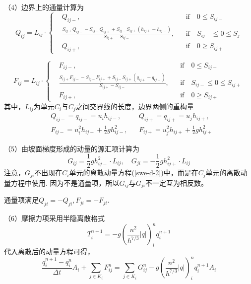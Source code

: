 （4）边界上的通量计算为
\begin{equation}
	Q_{ij} = L_{ij} \cdot \left\{
	\begin{aligned}
		& Q_{ij-}, && \mbox{if} \quad 0\leq S_{ij-} \\
		& \frac{S_{ij+} Q_{ij-} - S_{ij-} Q_{ij+} + S_{ij-} S_{ij+} \left(h_{ij+} - h_{ij-}\right)}{S_{ij+}-S_{ij-}} , && \mbox{if} \quad S_{ij-} \leq 0\leq S_j\\
		& Q_{ij+}, && \mbox{if} \quad 0\geq S_{ij+}
	\end{aligned}\right.
\end{equation}

\begin{equation}
F_{ij} = L_{ij} \cdot \left\{
\begin{aligned}
	& F_{ij-}, && \mbox{if} \quad 0\leq S_{ij-} \\
	& \frac{S_{ij+} F_{ij-} - S_{ij-} F_{ij+} + S_{ij-} S_{ij+} \left(q_{ij+} - q_{ij-}\right)}{S_{ij+}-S_{ij-}} , && \mbox{if} \quad S_{ij-} \leq 0\leq S_{ij+}\\
	& F_{ij+}, && \mbox{if} \quad 0\geq S_{ij+}
\end{aligned}\right.
\end{equation}
其中，$L_{ij}$为单元$C_i$与$C_j$之间交界线的长度，边界两侧的重构量
\begin{align*}
&Q_{ij-} = q_{ij-} = u_i h_{ij-},  && Q_{ij+} = q_{ij+} = u_j h_{ij+}, \\
&F_{ij-} = u_i^2h_{ij-}+\frac{1}{2}gh_{ij-}^2, && F_{ij+} = u_j^2h_{ij+}+\frac{1}{2}gh_{ij+}^2
\end{align*}

（5）由坡面梯度形成的动量的源汇项计算为\citep{audusse2004scientificcomputing}
\begin{equation}
G_{ij} = \frac{1}{2}gh_{ij-}^2 \cdot L_{ij}, \quad
G_{ji}=-\frac{1}{2}g h_{ij+}^2 \cdot L_{ij}
\end{equation}
注意，$G_{ji}$不出现在$C_i$单元的离散动量方程(\ref{swe-d-2})中，而是在$C_j$单元的离散动量方程中使用. 因为不是通量项，所以$G_{ij}$与$G_{ji}$不一定互为相反数。

通量项满足$Q_{ji} = -Q_{ji},F_{ji}=-F_{ji}$.

（6）摩擦力项采用半隐离散格式
\begin{equation}
T^{n+1}_i = -g \left(\frac{n^2}{h^{7/3}} \left|q\right|\right)^n_i q^{n+1}_i
\end{equation}
代入离散后的动量方程可得，
 \begin{equation}
 \frac{ q^{n+1}_i - q^n_i}{\Delta t} A_i + \sum_{j\in K_i} F^n_{ij} = \sum_{j\in K_i} G^n_{ij}  -g \left(\frac{n^2}{h^{7/3}} \left|q\right|\right)^n_i q^{n+1}_i  A_i 
  \end{equation}

